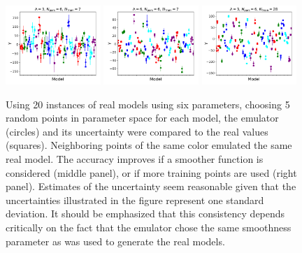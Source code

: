 \documentclass[UserManual.tex]{subfiles}
\begin{document}
\begin{figure}
\includegraphics[width=0.32\textwidth]{sixpars/NPars6_Lambda3_NTrain7}\hspace*{0.02\textwidth}
\includegraphics[width=0.32\textwidth]{sixpars/NPars6_Lambda6_NTrain7}\hspace*{0.02\textwidth}
\includegraphics[width=0.32\textwidth]{sixpars/NPars6_Lambda3_NTrain28}
\caption{\label{fig:sixpars}
Using 20 instances of real models using six parameters, choosing 5 random points in parameter space for each model, the emulator (circles) and its uncertainty were compared to the real values (squares). Neighboring points of the same color emulated the same real model. The accuracy improves if a smoother function is considered (middle panel), or if more training points are used (right panel). Estimates of the uncertainty seem reasonable given that the uncertainties illustrated in the figure represent one standard deviation. It should be emphasized that this consistency depends critically on the fact that the emulator chose the same smoothness parameter as was used to generate the real models.
}
\end{figure}
\end{document}
